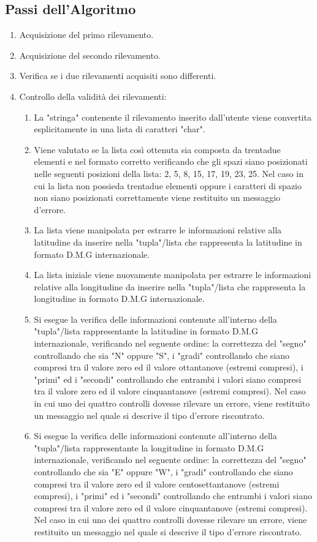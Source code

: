 \documentclass{article}
\begin{document}
\subsection{Passi dell'Algoritmo}
\begin{enumerate}
	\item Acquisizione del primo rilevamento.
	\item  Acquisizione del secondo rilevamento.
	\item Verifica se i due rilevamenti acquisiti sono differenti.
	
	\item Controllo della validità dei rilevamenti:
	\begin{enumerate}
		\item La "stringa" contenente il rilevamento inserito dall'utente viene convertita esplicitamente in una lista di caratteri "char".
		\item Viene valutato se la lista così ottenuta sia composta da trentadue elementi e nel formato corretto verificando che gli spazi siano posizionati nelle  seguenti posizioni della lista: 2, 5, 8, 15, 17, 19, 23, 25. Nel caso in cui la lista non possieda trentadue elementi oppure i caratteri di spazio non siano posizionati correttamente viene restituito un messaggio d'errore.
		\item La lista viene manipolata per estrarre le informazioni relative alla latitudine da inserire nella "tupla"/lista che rappresenta la latitudine in formato D.M.G internazionale.
		\item La lista iniziale viene nuovamente manipolata per estrarre le informazioni relative alla longitudine da inserire nella "tupla"/lista che rappresenta la longitudine in formato D.M.G internazionale.
		\item Si esegue la verifica delle informazioni contenute all'interno della "tupla"/lista rappresentante la latitudine in formato D.M.G internazionale, verificando nel seguente ordine:  la correttezza del "segno" controllando che sia "N" oppure "S", i "gradi" controllando che siano compresi tra il valore zero ed il valore ottantanove (estremi compresi), i "primi" ed i "secondi" controllando che entrambi i valori siano compresi tra il valore zero ed il valore cinquantanove (estremi compresi). Nel caso in cui uno dei quattro controlli dovesse rilevare un errore, viene restituito un messaggio nel quale si descrive il tipo d'errore riscontrato.
		\item Si esegue la verifica delle informazioni contenute all'interno della "tupla"/lista rappresentante la longitudine in formato D.M.G internazionale, verificando nel seguente ordine:  la correttezza del "segno" controllando che sia "E" oppure "W", i "gradi" controllando che siano compresi tra il valore zero ed il valore centosettantanove (estremi compresi), i "primi" ed i "secondi" controllando che entrambi i valori siano compresi tra il valore zero ed il valore cinquantanove (estremi compresi). Nel caso in cui uno dei quattro controlli dovesse rilevare un errore, viene restituito un messaggio nel quale si descrive il tipo d'errore riscontrato.
	\end{enumerate}


\end{enumerate}
\end{document}
